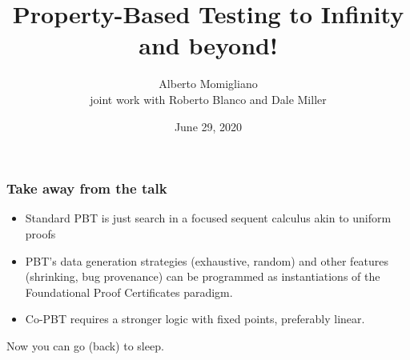 \documentclass{beamer}
\begin{document}
\title{
Property-Based Testing to Infinity and beyond!}


\author{Alberto Momigliano\\ joint work with {Roberto Blanco} and Dale Miller}
\date{June 29, 2020}

\begin{frame}
\titlepage
\end{frame}
\begin{frame}
  \frametitle{Take away from the talk}
  \begin{itemize}
  \item Standard PBT  is just search in a focused sequent calculus akin to uniform proofs
  \item PBT's data generation strategies (exhaustive, random) and
    other features (shrinking, bug provenance) can be programmed as
    instantiations of the Foundational Proof Certificates paradigm.
  \item Co-PBT requires a stronger logic with fixed points, preferably linear.
  \end{itemize}
    \pause
    
   Now you can go (back) to sleep.

\end{frame}


\end{document}
